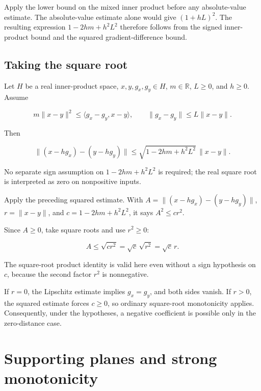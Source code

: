 \documentclass[11pt,a4paper]{report}
\begin{document}
Apply the lower bound on the mixed inner product before any absolute-value estimate. The absolute-value estimate alone would give \((1+hL)^2\). The resulting expression \(1-2hm+h^2L^2\) therefore follows from the signed inner-product bound and the squared gradient-difference bound.

\subsection{\texorpdfstring{Taking the square root}{Taking the square root}}
\label{report-step-UnadjustedLangevin-GradientStep-lean-2}


Let \(H\) be a real inner-product space, \(x,y,g_x,g_y\in H\), \(m\in\mathbb R\), \(L\ge0\), and \(h\ge0\). Assume

\[m\|x-y\|^2\le\langle g_x-g_y,x-y\rangle,\qquad\|g_x-g_y\|\le L\|x-y\|.\]

Then

\[\|(x-hg_x)-(y-hg_y)\|\le\sqrt{1-2hm+h^2L^2}\,\|x-y\|.\]

No separate sign assumption on \(1-2hm+h^2L^2\) is required; the real square root is interpreted as zero on nonpositive inputs.



Apply the preceding squared estimate. With \(A=\|(x-hg_x)-(y-hg_y)\|\), \(r=\|x-y\|\), and \(c=1-2hm+h^2L^2\), it says \(A^2\le cr^2\).



Since \(A\ge0\), take square roots and use \(r^2\ge0\):

\[A\le\sqrt{cr^2}=\sqrt c\,\sqrt{r^2}=\sqrt c\,r.\]

The square-root product identity is valid here even without a sign hypothesis on \(c\), because the second factor \(r^2\) is nonnegative.



If \(r=0\), the Lipschitz estimate implies \(g_x=g_y\), and both sides vanish. If \(r>0\), the squared estimate forces \(c\ge0\), so ordinary square-root monotonicity applies. Consequently, under the hypotheses, a negative coefficient is possible only in the zero-distance case.

\section{\texorpdfstring{Supporting planes and strong monotonicity}{Supporting planes and strong monotonicity}}
\label{proof-module-UnadjustedLangevin-StrongConvexity-lean}
\end{document}
